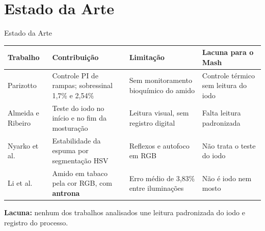 \documentclass[aspectratio=169]{beamer}
\begin{document}
\section{Estado da Arte}
\begin{frame}[t]{Estado da Arte}
  \begin{center}
    \footnotesize
    \renewcommand{\arraystretch}{1.0}
    \begin{tabular}{|>{\raggedright\arraybackslash}p{2.4cm}|>{\raggedright\arraybackslash}p{3.6cm}|>{\raggedright\arraybackslash}p{3.0cm}|>{\raggedright\arraybackslash}p{2.9cm}|}
      \hline
      \textbf{Trabalho} & \textbf{Contribuição} & \textbf{Limitação} & \textbf{Lacuna para o Mash} \\
      \hline
      Parizotto\footnotemark[1] & Controle PI de rampas; sobressinal 1,7\% e 2,54\% & Sem monitoramento bioquímico do amido & Controle térmico sem leitura do iodo \\
      \hline
      Almeida e Ribeiro\footnotemark[2] & Teste do iodo no início e no fim da mosturação & Leitura visual, sem registro digital & Falta leitura padronizada \\
      \hline
      Nyarko et al.\footnotemark[3] & Estabilidade da espuma por segmentação HSV & Reflexos e autofoco em RGB & Não trata o teste do iodo \\
      \hline
      Li et al.\footnotemark[4] & Amido em tabaco pela cor RGB, com \textbf{antrona} & Erro médio de 3,83\% entre iluminações & Não é iodo nem mosto \\
      \hline
    \end{tabular}
  \end{center}
  {\small\textbf{Lacuna:} nenhum dos trabalhos analisados une leitura padronizada do iodo e registro do processo.}
\end{frame}

\end{document}
